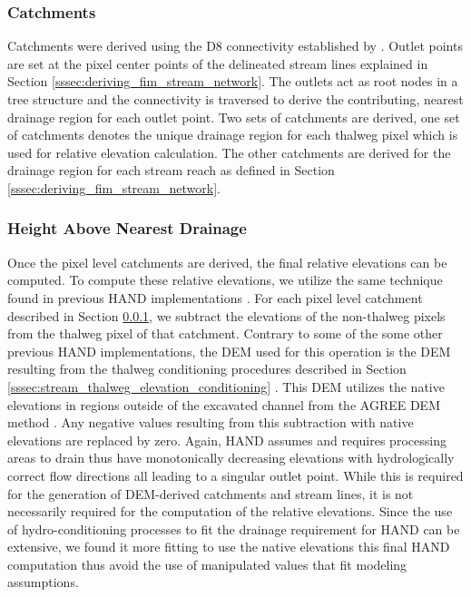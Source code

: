 \documentclass[draft]{dependencies/agujournal2019}
\begin{document}
\subsubsection{Catchments}
\label{sssec:catchments}
%
Catchments were derived using the D8 connectivity established by .
Outlet points are set at the pixel center points of the delineated stream lines explained in Section \ref{sssec:deriving_fim_stream_network}.
The outlets act as root nodes in a tree structure and the connectivity is traversed to derive the contributing, nearest drainage region for each outlet point.
Two sets of catchments are derived, one set of catchments denotes the unique drainage region for each thalweg pixel which is used for relative elevation calculation.
The other catchments are derived for the drainage region for each stream reach as defined in Section \ref{sssec:deriving_fim_stream_network}. 
%
\subsubsection{Height Above Nearest Drainage}
\label{sssec:hand}
%
Once the pixel level catchments are derived, the final relative elevations can be computed.
To compute these relative elevations, we utilize the same technique found in previous HAND implementations \cite{zheng2018geoflood,zheng2018river,nobre2011height,nobre2016hand,maidment2017conceptual,garousi2019terrain}.
For each pixel level catchment described in Section \ref{sssec:catchments}, we subtract the elevations of the non-thalweg pixels from the thalweg pixel of that catchment.
Contrary to some of the some other previous HAND implementations, the DEM used for this operation is the DEM resulting from the thalweg conditioning procedures described in Section \ref{sssec:stream_thalweg_elevation_conditioning} \cite{djokic2019arc}.
This DEM utilizes the native elevations in regions outside of the excavated channel from the AGREE DEM method \cite{djokic2019arc}.
Any negative values resulting from this subtraction with native elevations are replaced by zero.
Again, HAND assumes and requires processing areas to drain thus have monotonically decreasing elevations with hydrologically correct flow directions all leading to a singular outlet point.
While this is required for the generation of DEM-derived catchments and stream lines, it is not necessarily required for the computation of the relative elevations.
Since the use of hydro-conditioning processes to fit the drainage requirement for HAND can be extensive, we found it more fitting to use the native elevations this final HAND computation thus avoid the use of manipulated values that fit modeling assumptions.
%
\end{document}
